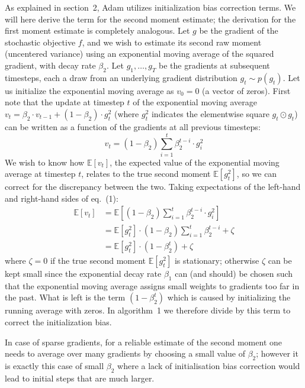 \documentclass[11pt]{article}
\begin{document}
As explained in section~2, Adam utilizes initialization bias
correction terms. We will here derive the term for the second
moment estimate; the derivation for the first moment estimate is
completely analogous. Let $g$ be the gradient of the stochastic
objective $f$, and we wish to estimate its second raw moment
(uncentered variance) using an exponential moving average of the
squared gradient, with decay rate $\beta_2$. Let
$g_1, \ldots, g_T$ be the gradients at subsequent timesteps, each
a draw from an underlying gradient distribution
$g_t \sim p(g_t)$. Let us initialize the exponential moving
average as $v_0 = 0$ (a vector of zeros). First note that the
update at timestep $t$ of the exponential moving average
$v_t = \beta_2 \cdot v_{t-1} + (1 - \beta_2) \cdot g_t^2$ (where
$g_t^2$ indicates the elementwise square $g_t \odot g_t$) can be
written as a function of the gradients at all previous timesteps:
%
\begin{equation}
v_t = (1 - \beta_2) \sum_{i=1}^{t} \beta_2^{t-i} \cdot g_i^2
\end{equation}
%
We wish to know how $\mathbb{E}[v_t]$, the expected value of the
exponential moving average at timestep $t$, relates to the true
second moment $\mathbb{E}[g_t^2]$, so we can correct for the
discrepancy between the two. Taking expectations of the left-hand
and right-hand sides of eq.~(1):
%
\begin{align}
\mathbb{E}[v_t] &= \mathbb{E}\!\left[(1 - \beta_2) \sum_{i=1}^{t} \beta_2^{t-i} \cdot g_i^2\right] \\
                &= \mathbb{E}[g_t^2] \cdot (1 - \beta_2) \sum_{i=1}^{t} \beta_2^{t-i} + \zeta \\
                &= \mathbb{E}[g_t^2] \cdot (1 - \beta_2^t) + \zeta
\end{align}
%
where $\zeta = 0$ if the true second moment $\mathbb{E}[g_t^2]$ is
stationary; otherwise $\zeta$ can be kept small since the
exponential decay rate $\beta_1$ can (and should) be chosen such
that the exponential moving average assigns small weights to
gradients too far in the past. What is left is the term
$(1 - \beta_2^t)$ which is caused by initializing the running
average with zeros. In algorithm~1 we therefore divide by this
term to correct the initialization bias.

In case of sparse gradients, for a reliable estimate of the second
moment one needs to average over many gradients by choosing a
small value of $\beta_2$; however it is exactly this case of small
$\beta_2$ where a lack of initialisation bias correction would
lead to initial steps that are much larger.

\end{document}
